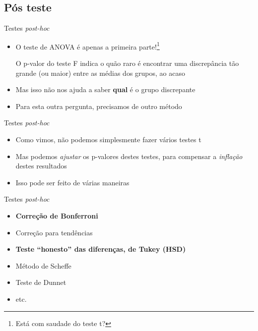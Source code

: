 \documentclass{beamer}
\begin{document}
\subsection{Pós teste}

\begin{frame}{Testes {\em post-hoc}}
  \begin{itemize}
    \footnotesize
  \item O teste de ANOVA é apenas a primeira parte!\footnote{Está com saudade do teste t?}
    \bigskip
    \bigskip
    \begin{block}{}
      O p-valor do teste F indica o quão raro é encontrar uma discrepância tão grande (ou maior) entre as médias dos grupos, ao acaso
    \end{block}
    \bigskip
    \bigskip
  \item Mas isso não nos ajuda a saber {\bf qual} é o grupo discrepante
  \item Para esta outra pergunta, precisamos de outro método
  \end{itemize}
\end{frame}

\begin{frame}{Testes {\em post-hoc}}
  \begin{itemize}
    \footnotesize
  \item Como vimos, não podemos simplesmente fazer vários testes t
    \bigskip
    \bigskip
  \item Mas podemos {\em ajustar} os p-valores destes testes, para compensar a {\em inflação} destes resultados
    \bigskip
    \bigskip
  \item Isso pode ser feito de várias maneiras
  \end{itemize}
\end{frame}

\begin{frame}{Testes {\em post-hoc}}
  \begin{itemize}
    \small
  \item {\bf Correção de Bonferroni}
  \item Correção para tendências
  \item {\bf Teste ``honesto'' das diferenças, de Tukey (HSD)}
  \item Método de Scheffe
  \item Teste de Dunnet
  \item etc.
  \end{itemize}
\end{frame}
\end{document}
